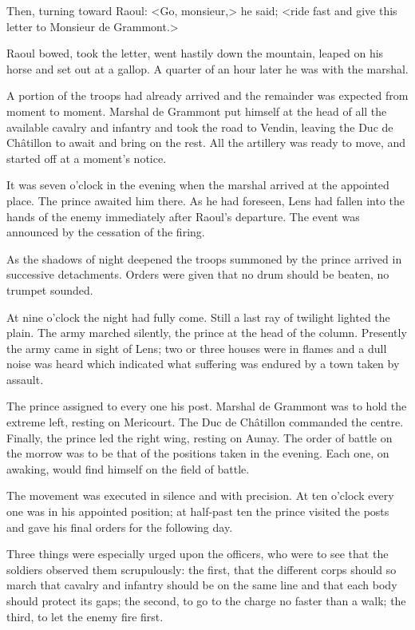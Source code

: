 Then, turning toward Raoul: <Go, monsieur,> he said; <ride fast and give this letter to Monsieur de Grammont.>

Raoul bowed, took the letter, went hastily down the mountain, leaped on his horse and set out at a gallop. A quarter of an hour later he was with the marshal.

A portion of the troops had already arrived and the remainder was expected from moment to moment. Marshal de Grammont put himself at the head of all the available cavalry and infantry and took the road to Vendin, leaving the Duc de Châtillon to await and bring on the rest. All the artillery was ready to move, and started off at a moment's notice.

It was seven o'clock in the evening when the marshal arrived at the appointed place. The prince awaited him there. As he had foreseen, Lens had fallen into the hands of the enemy immediately after Raoul's departure. The event was announced by the cessation of the firing.

As the shadows of night deepened the troops summoned by the prince arrived in successive detachments. Orders were given that no drum should be beaten, no trumpet sounded.

At nine o'clock the night had fully come. Still a last ray of twilight lighted the plain. The army marched silently, the prince at the head of the column. Presently the army came in sight of Lens; two or three houses were in flames and a dull noise was heard which indicated what suffering was endured by a town taken by assault.

The prince assigned to every one his post. Marshal de Grammont was to hold the extreme left, resting on Mericourt. The Duc de Châtillon commanded the centre. Finally, the prince led the right wing, resting on Aunay. The order of battle on the morrow was to be that of the positions taken in the evening. Each one, on awaking, would find himself on the field of battle.

The movement was executed in silence and with precision. At ten o'clock every one was in his appointed position; at half-past ten the prince visited the posts and gave his final orders for the following day.

Three things were especially urged upon the officers, who were to see that the soldiers observed them scrupulously: the first, that the different corps should so march that cavalry and infantry should be on the same line and that each body should protect its gaps; the second, to go to the charge no faster than a walk; the third, to let the enemy fire first.

